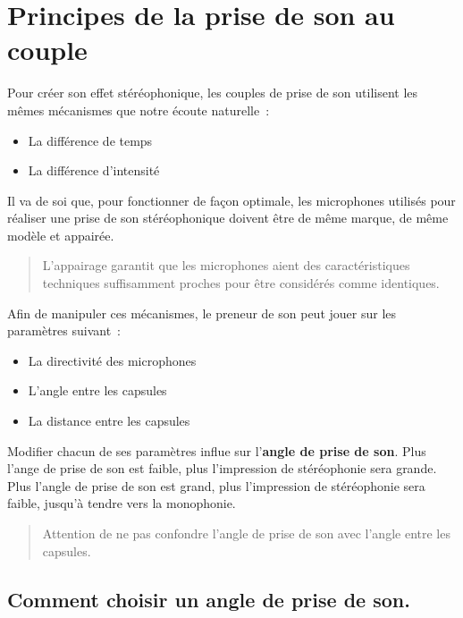 \documentclass[
]{book}
\providecommand{\tightlist}{%
  \setlength{\itemsep}{0pt}\setlength{\parskip}{0pt}}
\begin{document}
\hypertarget{principes-de-la-prise-de-son-au-couple}{%
\section{Principes de la prise de son au couple}\label{principes-de-la-prise-de-son-au-couple}}

Pour créer son effet stéréophonique, les couples de prise de son utilisent les mêmes mécanismes que notre écoute naturelle~:

\begin{itemize}
\tightlist
\item
  La différence de temps
\item
  La différence d'intensité
\end{itemize}

Il va de soi que, pour fonctionner de façon optimale, les microphones utilisés pour réaliser une prise de son stéréophonique doivent être de même marque, de même modèle et appairée.

\begin{quote}
L'appairage garantit que les microphones aient des caractéristiques techniques suffisamment proches pour être considérés comme identiques.
\end{quote}

Afin de manipuler ces mécanismes, le preneur de son peut jouer sur les paramètres suivant~:

\begin{itemize}
\tightlist
\item
  La directivité des microphones
\item
  L'angle entre les capsules
\item
  La distance entre les capsules
\end{itemize}

Modifier chacun de ses paramètres influe sur l'\textbf{angle de prise de son}. Plus l'ange de prise de son est faible, plus l'impression de stéréophonie sera grande. Plus l'angle de prise de son est grand, plus l'impression de stéréophonie sera faible, jusqu'à tendre vers la monophonie.

\begin{quote}
Attention de ne pas confondre l'angle de prise de son avec l'angle entre les capsules.
\end{quote}

\hypertarget{comment-choisir-un-angle-de-prise-de-son.}{%
\subsection{Comment choisir un angle de prise de son.}\label{comment-choisir-un-angle-de-prise-de-son.}}
\end{document}
